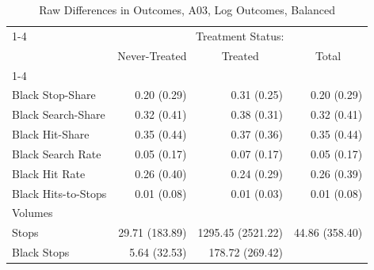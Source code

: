 \begin{table}[!h]
\caption{Raw Differences in Outcomes, A03, Log Outcomes, Balanced}
\centering
\begin{tabular}{llll}
\cline{1-4}
\multicolumn{1}{r}{} &
  \multicolumn{3}{c}{Treatment Status:} \\
\multicolumn{1}{r}{} &
  \multicolumn{1}{c}{Never-Treated} &
  \multicolumn{1}{c}{Treated} &
  \multicolumn{1}{c}{Total} \\
\cline{1-4}
\multicolumn{1}{l}{Rates} &
  \multicolumn{1}{r}{} &
  \multicolumn{1}{r}{} &
  \multicolumn{1}{r}{} \\
\multicolumn{1}{l}{\hspace{1em}Black Stop-Share} &
  \multicolumn{1}{r}{0.20 (0.29)} &
  \multicolumn{1}{r}{0.31 (0.25)} &
  \multicolumn{1}{r}{0.20 (0.29)} \\
\multicolumn{1}{l}{\hspace{1em}Black Search-Share} &
  \multicolumn{1}{r}{0.32 (0.41)} &
  \multicolumn{1}{r}{0.38 (0.31)} &
  \multicolumn{1}{r}{0.32 (0.41)} \\
\multicolumn{1}{l}{\hspace{1em}Black Hit-Share} &
  \multicolumn{1}{r}{0.35 (0.44)} &
  \multicolumn{1}{r}{0.37 (0.36)} &
  \multicolumn{1}{r}{0.35 (0.44)} \\
\multicolumn{1}{l}{\hspace{1em}Black Search Rate} &
  \multicolumn{1}{r}{0.05 (0.17)} &
  \multicolumn{1}{r}{0.07 (0.17)} &
  \multicolumn{1}{r}{0.05 (0.17)} \\
\multicolumn{1}{l}{\hspace{1em}Black Hit Rate} &
  \multicolumn{1}{r}{0.26 (0.40)} &
  \multicolumn{1}{r}{0.24 (0.29)} &
  \multicolumn{1}{r}{0.26 (0.39)} \\
\multicolumn{1}{l}{\hspace{1em}Black Hits-to-Stops} &
  \multicolumn{1}{r}{0.01 (0.08)} &
  \multicolumn{1}{r}{0.01 (0.03)} &
  \multicolumn{1}{r}{0.01 (0.08)} \\
\multicolumn{1}{l}{Volumes} &
  \multicolumn{1}{r}{} &
  \multicolumn{1}{r}{} &
  \multicolumn{1}{r}{} \\
\multicolumn{1}{l}{\hspace{1em}Stops} &
  \multicolumn{1}{r}{29.71 (183.89)} &
  \multicolumn{1}{r}{1295.45 (2521.22)} &
  \multicolumn{1}{r}{44.86 (358.40)} \\
\multicolumn{1}{l}{\hspace{1em}Black Stops} &
  \multicolumn{1}{r}{5.64 (32.53)} &
  \multicolumn{1}{r}{178.72 (269.42)} &

\end{tabular}
\end{table}
